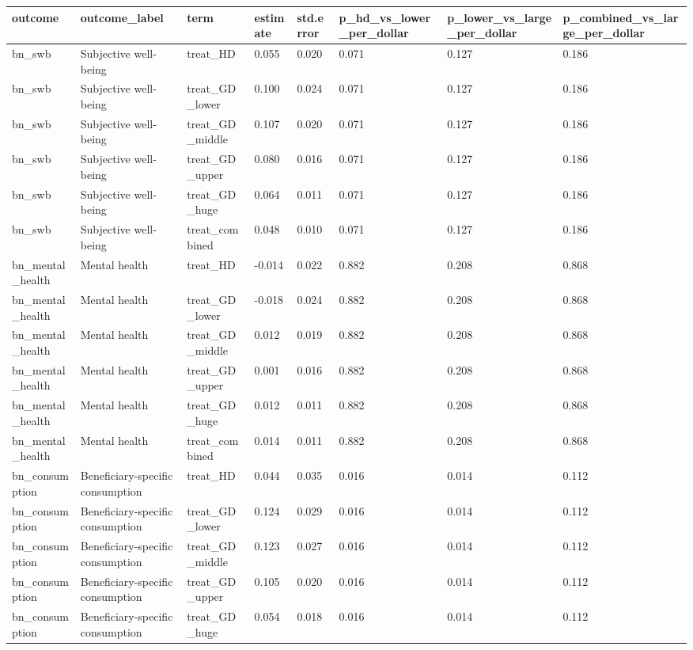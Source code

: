 \begin{tabular}{llllllll}
\toprule
outcome & outcome\_label & term & estimate & std.error & p\_hd\_vs\_lower\_per\_dollar & p\_lower\_vs\_large\_per\_dollar & p\_combined\_vs\_large\_per\_dollar
 \\
\midrule
bn\_swb & Subjective well-being & treat\_HD & 0.055 & 0.020 & 0.071 & 0.127 & 0.186 \\
bn\_swb & Subjective well-being & treat\_GD\_lower & 0.100 & 0.024 & 0.071 & 0.127 & 0.186 \\
bn\_swb & Subjective well-being & treat\_GD\_middle & 0.107 & 0.020 & 0.071 & 0.127 & 0.186 \\
bn\_swb & Subjective well-being & treat\_GD\_upper & 0.080 & 0.016 & 0.071 & 0.127 & 0.186 \\
bn\_swb & Subjective well-being & treat\_GD\_huge & 0.064 & 0.011 & 0.071 & 0.127 & 0.186 \\
bn\_swb & Subjective well-being & treat\_combined & 0.048 & 0.010 & 0.071 & 0.127 & 0.186 \\
bn\_mental\_health & Mental health & treat\_HD & -0.014 & 0.022 & 0.882 & 0.208 & 0.868 \\
bn\_mental\_health & Mental health & treat\_GD\_lower & -0.018 & 0.024 & 0.882 & 0.208 & 0.868 \\
bn\_mental\_health & Mental health & treat\_GD\_middle & 0.012 & 0.019 & 0.882 & 0.208 & 0.868 \\
bn\_mental\_health & Mental health & treat\_GD\_upper & 0.001 & 0.016 & 0.882 & 0.208 & 0.868 \\
bn\_mental\_health & Mental health & treat\_GD\_huge & 0.012 & 0.011 & 0.882 & 0.208 & 0.868 \\
bn\_mental\_health & Mental health & treat\_combined & 0.014 & 0.011 & 0.882 & 0.208 & 0.868 \\
bn\_consumption & Beneficiary-specific consumption & treat\_HD & 0.044 & 0.035 & 0.016 & 0.014 & 0.112 \\
bn\_consumption & Beneficiary-specific consumption & treat\_GD\_lower & 0.124 & 0.029 & 0.016 & 0.014 & 0.112 \\
bn\_consumption & Beneficiary-specific consumption & treat\_GD\_middle & 0.123 & 0.027 & 0.016 & 0.014 & 0.112 \\
bn\_consumption & Beneficiary-specific consumption & treat\_GD\_upper & 0.105 & 0.020 & 0.016 & 0.014 & 0.112 \\
bn\_consumption & Beneficiary-specific consumption & treat\_GD\_huge & 0.054 & 0.018 & 0.016 & 0.014 & 0.112 \\

\end{tabular}
